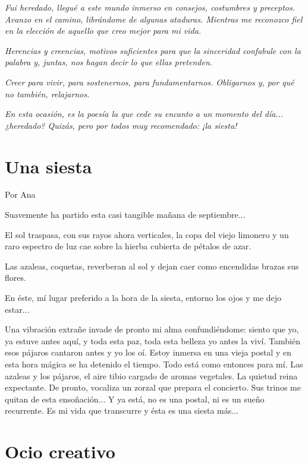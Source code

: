 \documentclass[11pt,twoside,openright,a5paper]{book}
\begin{document}
\vspace{0.5cm}
\emph{Fui heredado, llegué a este mundo inmerso en consejos, costumbres y preceptos. Avanzo en el camino, librándome de algunas ataduras. Mientras me reconozco fiel en la elección de aquello que creo mejor para mi vida.}

\emph{Herencias y creencias, motivos suficientes para que la sinceridad confabule con la palabra y, juntas, nos hagan decir lo que ellas pretenden.}

\emph{Creer para vivir, para sostenernos, para fundamentarnos. Obligarnos y, por qué no también, relajarnos.}

\emph{En esta ocasión, es la poesía la que cede su encanto a un momento del día... ¿heredado? Quizás, pero por todos muy recomendado: ¡la siesta!}

\section*{Una siesta}

                                                                                                             \begin{flushright}Por Ana\end{flushright}

Suavemente ha partido esta casi tangible mañana de septiembre...

El sol traspasa, con sus rayos ahora verticales, la copa del viejo limonero y un raro espectro de luz cae sobre la hierba cubierta de pétalos de azar.

Las azaleas, coquetas, reverberan al sol y dejan caer como encendidas brazas sus flores.

En éste, mí lugar preferido a la hora de la siesta, entorno los ojos y me dejo estar...

Una vibración extrañe invade de pronto mi alma confundiéndome: siento que yo, ya estuve antes aquí, y toda esta paz, toda esta belleza yo antes la viví. También esos pájaros cantaron antes y yo los oí. Estoy inmersa en una vieja postal y en esta hora mágica se ha detenido el tiempo. Todo está como entonces para mí. Las azaleas y los pájaros, el aire tibio cargado de aromas vegetales. La quietud reina expectante. De pronto, vocaliza un zorzal que prepara el concierto. Sus trinos me quitan de esta ensoñación...
Y ya está, no es una postal, ni es un sueño recurrente. Es mi vida que transcurre y ésta es una siesta más...

\section*{Ocio creativo}
\end{document}
